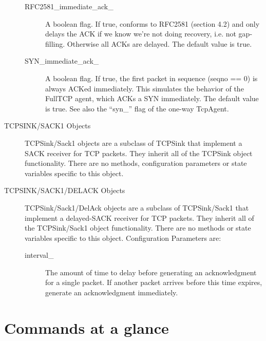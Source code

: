 \begin{description}
\begin{description}
\item[RFC2581\_immediate\_ack\_]
A boolean flag. If true, conforms to RFC2581 (section 4.2) and only delays
the ACK if we know we're not doing recovery, i.e. not gap-filling.
Otherwise all ACKs are delayed. The default value is true.

\item[SYN\_immediate\_ack\_]
A boolean flag. If true, the first packet in sequence (seqno == 0) is
always ACKed immediately. This simulates the behavior of the FullTCP
agent, which ACKs a SYN immediately. The default value is true.
See also the ``syn\_'' flag of the one-way TcpAgent.
\end{description}


\item[TCPSINK/SACK1 Objects]
TCPSink/Sack1 objects are a subclass of TCPSink that implement a SACK
receiver for TCP packets. They inherit all of the TCPSink object
functionality. There are no methods, configuration parameters or state
variables specific to this object. 


\item[TCPSINK/SACK1/DELACK Objects]
TCPSink/Sack1/DelAck objects are a subclass of TCPSink/Sack1 that
implement a delayed-SACK receiver for TCP packets. They inherit all of the
TCPSink/Sack1 object functionality. There are no methods or state
variables specific to this object. 
Configuration Parameters are:
\begin{description}

\item[interval\_]
The amount of time to delay before generating an acknowledgment for a
single packet. If another packet arrives before this time expires,
generate an acknowledgment immediately. 
\end{description}
\end{description}



\section{Commands at a glance}
\label{sec:agentscommand}

